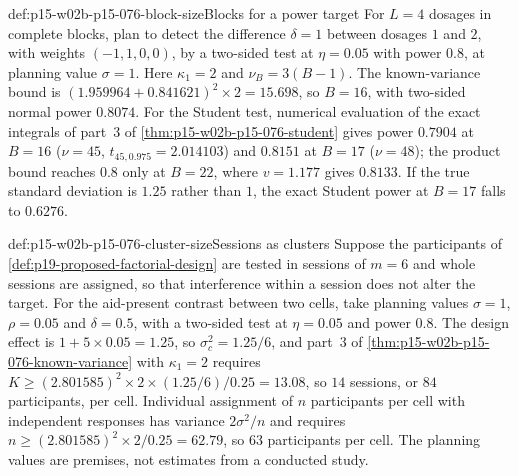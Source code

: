 \begin{hbexample}{def:p15-w02b-p15-076-block-size}{Blocks for a power target}
For \(L=4\) dosages in complete blocks, plan to detect the difference
\(\delta=1\) between dosages \(1\) and \(2\), with weights \((-1,1,0,0)\),
by a two-sided test at \(\eta=0.05\) with power \(0.8\), at planning value
\(\sigma=1\). Here \(\kappa_1=2\) and \(\nu_B=3(B-1)\). The known-variance
bound is \((1.959964+0.841621)^2\times2=15.698\), so \(B=16\), with
two-sided normal power \(0.8074\). For the Student test, numerical
evaluation of the exact integrals of part~3 of
\cref{thm:p15-w02b-p15-076-student} gives power \(0.7904\) at \(B=16\)
(\(\nu=45\), \(t_{45,0.975}=2.014103\)) and \(0.8151\) at \(B=17\)
(\(\nu=48\)); the product bound reaches \(0.8\) only at \(B=22\), where
\(v=1.177\) gives \(0.8133\). If the true standard deviation is \(1.25\)
rather than \(1\), the exact Student power at \(B=17\) falls to
\(0.6276\).
\end{hbexample}

\begin{hbexample}{def:p15-w02b-p15-076-cluster-size}{Sessions as clusters}
Suppose the participants of \cref{def:p19-proposed-factorial-design} are
tested in sessions of \(m=6\) and whole sessions are assigned, so that
interference within a session does not alter the target. For the
aid-present contrast between two cells, take planning values \(\sigma=1\),
\(\rho=0.05\) and \(\delta=0.5\), with a two-sided test at \(\eta=0.05\)
and power \(0.8\). The design effect is \(1+5\times0.05=1.25\), so
\(\sigma_c^2=1.25/6\), and part~3 of
\cref{thm:p15-w02b-p15-076-known-variance} with \(\kappa_1=2\) requires
\(K\geq(2.801585)^2\times2\times(1.25/6)/0.25=13.08\), so \(14\)
sessions, or \(84\) participants, per cell. Individual assignment of
\(n\) participants per cell with independent responses has variance
\(2\sigma^2/n\) and requires \(n\geq(2.801585)^2\times2/0.25=62.79\),
so \(63\) participants per cell. The planning values are premises, not estimates from a conducted
study.
\end{hbexample}

